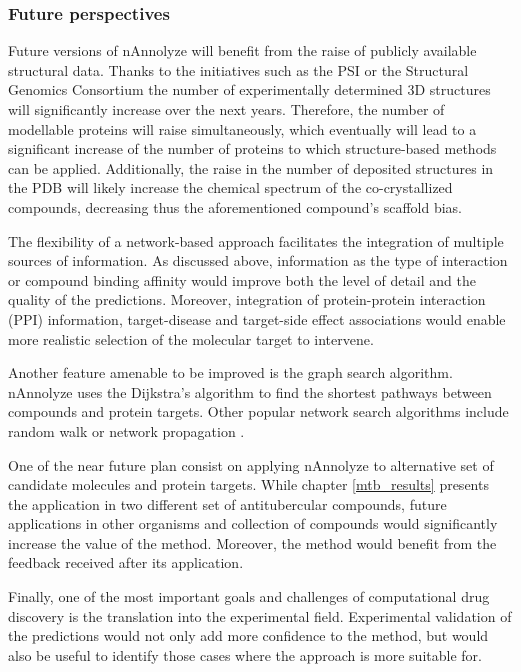 \documentclass[11pt, b5paper,twoside]{tesi_upf}
\begin{document}
  
  
\subsubsection{Future perspectives}\label{future_nannolyze}

 \par Future versions of nAnnolyze will benefit from the raise of publicly available structural data. Thanks to the initiatives such as the PSI \cite{Norvell2007} or the Structural Genomics Consortium \cite{GIleadi2007} the number of experimentally determined 3D structures will significantly increase over the next years. Therefore, the number of modellable proteins will raise simultaneously, which eventually will lead to a significant increase of the number of proteins to which structure-based methods can be applied. Additionally, the raise in the number of deposited structures in the PDB will likely increase the chemical spectrum of the co-crystallized compounds, decreasing thus the aforementioned compound's scaffold bias.
  
 \par The flexibility of a network-based approach facilitates the integration of multiple sources of information. As discussed above, information as the type of interaction or compound binding affinity would improve both the level of detail and the quality of the predictions. Moreover, integration of protein-protein interaction (PPI) information, target-disease and target-side effect associations would enable more realistic selection of the molecular target to intervene. 
 
 \par Another feature amenable to be improved is the graph search algorithm. nAnnolyze uses the Dijkstra's algorithm \cite{Dijkstra1959} to find the shortest pathways between compounds and protein targets. Other popular network search algorithms include random walk \cite{Chen2012} or network propagation \cite{Huang2013a}.
 \par One of the near future plan consist on applying nAnnolyze to alternative set of candidate molecules and protein targets. While chapter \ref{mtb_results} presents the application in two different set of antitubercular compounds, future applications in other organisms and collection of compounds would significantly increase the value of the method. Moreover, the method would benefit from the feedback received after its application. 
 \par Finally, one of the most important goals and challenges of computational drug discovery is the translation into the experimental field. Experimental validation of the predictions would not only add more confidence to the method, but would also be useful to identify those cases where the approach is more suitable for.          
\end{document}
